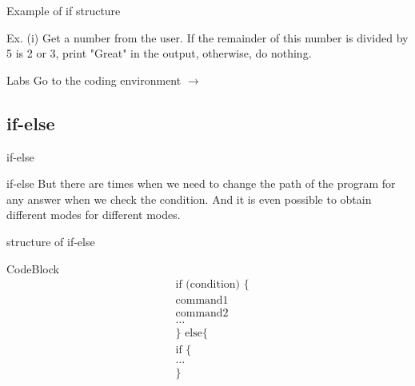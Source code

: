 \documentclass{beamer}\usepackage[]{graphicx}\usepackage[]{xcolor}
\begin{document}
\begin{frame}{Example of if structure}
\begin{exampleblock}{Ex. (i)}
Get a number from the user. If the remainder of this number is divided by 5 ‌is 2 or 3, print "Great" in the output, otherwise, do nothing.
\end{exampleblock}
\end{frame}



\begin{frame}{Labs}
    \alert{{\Large Go to the coding environment $\rightarrow$}}
\end{frame}













\subsection{if-else}
\begin{frame}{if-else}
    \begin{block}{if-else}
        But there are times when we need to change the path of the program for any answer when we check the condition. And it is even possible to obtain different modes for different modes.
    \end{block}
\end{frame}

\begin{frame}{structure of if-else}
    \begin{block}{CodeBlock}
\begin{align*}
    & \text{if (condition) \{} \\
    & \text{command1} \\
    & \text{command2} \\
    & \dots \\
    & \text{\}}\text{~else\{}\\
    & \text{if \{}\\
    & \dots \\
    & \text{\}}
\end{align*}
\end{block}
    
\end{frame}
\end{document}

